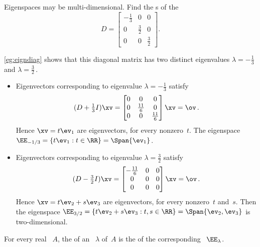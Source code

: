 \begin{example} \label{eg:espace2d}
Eigenspaces may be multi-dimensional.  
Find the s of the 
\begin{equation*}
D=\begin{bmatrix} -\frac13&0&0\\0&\frac32&0\\0&0&\frac32 \end{bmatrix}.
\end{equation*}
\begin{solution} 
\cref{eg:eigndiag} shows that this diagonal matrix has two distinct eigenvalues \(\lambda=-\frac13\) and \(\lambda=\frac32\)\,.
\begin{itemize}
\item Eigenvectors corresponding to eigenvalue \(\lambda=-\frac13\) satisfy
\begin{equation*}
(D+\tfrac13I)\xv=\begin{bmatrix} 0&0&0\\0&\frac{11}6&0\\0&0&\frac{11}6 \end{bmatrix}\xv=\ov\,.
\end{equation*}
Hence \(\xv=t\ev_1\) are eigenvectors, for every nonzero~\(t\).
The eigenspace \(\EE_{-1/3}=\{t\ev_1 : t\in\RR\}=\Span\{\ev_1\}\).

\item Eigenvectors corresponding to eigenvalue \(\lambda=\frac32\) satisfy
\begin{equation*}
(D-\tfrac32I)\xv=\begin{bmatrix} -\frac{11}6&0&0\\0&0&0\\0&0&0 \end{bmatrix}\xv=\ov\,.
\end{equation*}
Hence \(\xv=t\ev_2+s\ev_3\) are eigenvectors, for every nonzero~\(t\) and~\(s\).
Then the eigenspace \(\EE_{3/2}=\{t\ev_2+s\ev_3 : t,s\in\RR\}=\Span\{\ev_2,\ev_3\}\) is two-dimensional.

\end{itemize}
\end{solution}
\end{example}




\begin{definition} \label{def:eigsymult}
For every real ~\(A\), the  of an ~\(\lambda\) of~\(A\) is the  of the corresponding ~\(\EE_\lambda\).
\end{definition}

